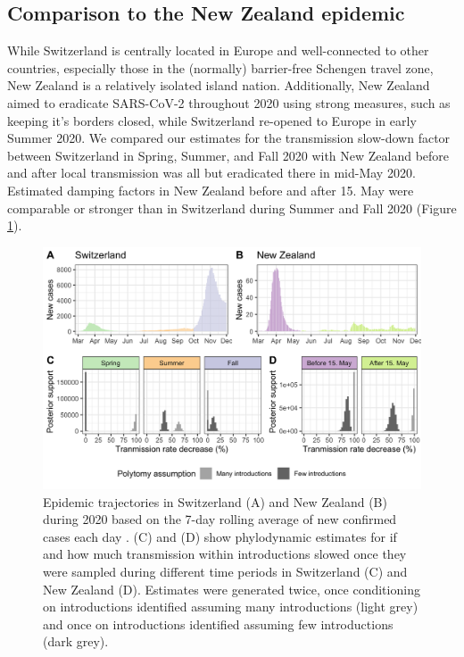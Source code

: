 \documentclass[9pt,twoside,lineno]{pnas-new} %
\begin{document}
\subsection{Comparison to the New Zealand epidemic}
While Switzerland is centrally located in Europe and well-connected to other countries, especially those in the (normally) barrier-free Schengen travel zone, New Zealand is a relatively isolated island nation. Additionally, New Zealand aimed to eradicate SARS-CoV-2 throughout 2020 using strong measures, such as keeping it's borders closed, while Switzerland re-opened to Europe in early Summer 2020. We compared our estimates for the transmission slow-down factor between Switzerland in Spring, Summer, and Fall 2020 with New Zealand before and after local transmission was all but eradicated there in mid-May 2020. Estimated damping factors in New Zealand before and after 15. May were comparable or stronger than in Switzerland during Summer and Fall 2020 (Figure \ref{fig:scale-factor}).

\begin{figure}[]
\centering
\includegraphics[width=0.75\linewidth]{figures/contact_tracing_factors_no_sampUB_compared_to_cases.png}
\caption{Epidemic trajectories in Switzerland (A) and New Zealand (B) during 2020 based on the 7-day rolling average of new confirmed cases each day \cite{Appel}. (C) and (D) show phylodynamic estimates for if and how much transmission within introductions slowed once they were sampled during different time periods in Switzerland (C) and New Zealand (D). Estimates were generated twice, once conditioning on introductions identified assuming many introductions (light grey) and once on introductions identified assuming few introductions (dark grey).}  
\label{fig:scale-factor}
\end{figure}
\end{document}
